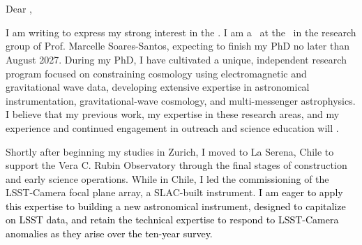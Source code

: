 \documentclass[10pt]{article}
\newcommand{\tcolor}{black}
\begin{document}
\begin{flushright}
\textbf{\ApplicantName}\\ 
\ApplicantInstitutionNameOne\\
\ApplicantInstitutionNameTwo\\
\ApplicantInstitutionAddressLine\\ \ApplicantInstitutionCityLine\\
\end{flushright}

\RecipientNameOne \hfill \LetterDate \\
\RecipientInstitution \\

Dear \RecipientNameTwo,

\vspace{0.25em}

I am writing to express my strong interest in the \PositionTitle. 
I am a \ApplicantTitle\ at the \ApplicantInstitutionNameTwo\ in the research group of Prof. Marcelle Soares-Santos, expecting to finish my PhD no later than August 2027.
During my PhD, I have cultivated a unique, independent research program focused on constraining cosmology using electromagnetic and gravitational wave data, developing extensive expertise in astronomical instrumentation, gravitational-wave cosmology, and multi-messenger astrophysics. I believe that my previous work, my expertise in these research areas, and my experience and continued engagement in outreach and science education will \HostGroupDescriptor.

Shortly after beginning my studies in Zurich, I moved to La Serena, Chile to support the Vera C. Rubin Observatory through the final stages of construction and early science operations.
While in Chile, I led the commissioning of the LSST-Camera focal plane array, a SLAC-built instrument. 
\textcolor{\tcolor}{I am eager to apply this expertise to building a new astronomical instrument, designed to capitalize on LSST data, and retain the technical expertise to respond to LSST-Camera anomalies as they arise over the ten-year survey.}
\end{document}
